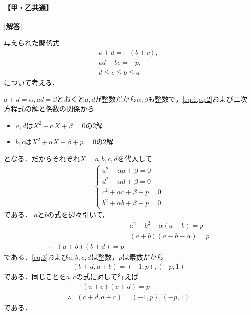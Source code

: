 \documentclass[../../main.tex]{subfiles}
\begin{document}
\begin{oframed}
  
\end{oframed}

\paragraph{【甲・乙共通】}

{\bf [解答]}

与えられた関係式
\begin{align}
  a+d=-(b+c),\label{eq:1}\\
  ad-bc=-p,\label{eq:2}\\
  d\leqq c\leqq b\leqq a \label{eq:3}
\end{align}
について考える．

$a+d=\alpha, ad=\beta$とおくと$a,d$が整数だから$\alpha,\beta$も整数で，\cref{eq:1,eq:2}および二次方程式の解と係数の関係から
\begin{itemize}
  \item $a,d$は$X^2-\alpha X+\beta=0$の2解 \\
  \item $b,c$は$X^2+\alpha X+\beta+p=0$の2解
\end{itemize}
となる．だからそれぞれ$X=a,b,c,d$を代入して
\begin{align}
  \begin{cases}
    a^2-\alpha a+\beta=0 \\
    d^2-\alpha d+\beta=0 \\
    c^2+\alpha c+\beta+p=0 \\
    b^2+\alpha b+\beta+p=0
  \end{cases}
\end{align}
である．
$a$と$b$の式を辺々引いて，
\begin{align}
  & a^2-b^2-\alpha(a+b)=p \\
  & (a+b)(a-b-\alpha)=p \\
  \therefore
  -(a+b)(b+d)=p
\end{align}
である．\cref{eq:3}および$a,b,c,d$は整数，$p$は素数だから
\begin{align}
  (b+d,a+b)=(-1,p),(-p,1) \label{eq:4}
\end{align}
である．同じことを$a,c$の式に対して行えば
\begin{align}
  & -(a+c)(c+d)=p \\
  \therefore
  & (c+d,a+c)=(-1,p),(-p,1) \label{eq:5}
\end{align}
である．
\end{document}
